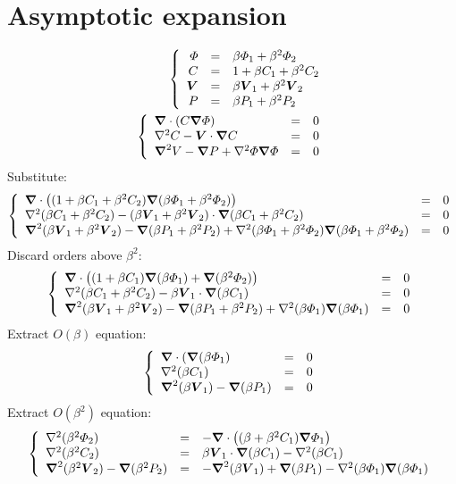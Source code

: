 \section{Asymptotic expansion}
\begin{eqnarray}
 \brc{rcl}{
  \varPhi &=& \beta\varPhi_1 + \beta^2\varPhi_2 \\
  C &=& 1 + \beta C_1 + \beta^2 C_2 \\
  \bV &=& \beta \bV_1 + \beta^2 \bV_2 \\
  P &=& \beta P_1 + \beta^2 P_2}
  \\
 \brc{lll}{
  \bnabla \cdot \brcs{C \bnabla \varPhi} &=& 0 \\
  \Laplacian C - \bV \cdot \bnabla C &=& 0 \\
  \bLaplacian V - \bnabla P + \Laplacian \varPhi \bnabla\varPhi &=& 0 }
\end{eqnarray}
Substitute:
\begin{eqnarray}
 \brc{lll}{
  \bnabla \cdot \brcs{(1 + \beta C_1 + \beta^2 C_2) \bnabla (\beta\varPhi_1 + \beta^2\varPhi_2)} &=& 0 \\
  \Laplacian (\beta C_1 + \beta^2 C_2) - (\beta \bV_1 + \beta^2 \bV_2) \cdot \bnabla (\beta C_1 + \beta^2 C_2) &=& 0 \\
  \bLaplacian (\beta \bV_1 + \beta^2 \bV_2) - \bnabla (\beta P_1 + \beta^2 P_2) + \Laplacian (\beta\varPhi_1 + \beta^2\varPhi_2) \bnabla(\beta\varPhi_1 + \beta^2\varPhi_2) &=& 0 }
\end{eqnarray}
Discard orders above $\beta^2$:
\begin{eqnarray}
 \brc{lll}{
  \bnabla \cdot \brcs{(1 + \beta C_1) \bnabla (\beta \varPhi_1) + \bnabla(\beta^2\varPhi_2)} &=& 0 \\
  \Laplacian (\beta C_1 + \beta^2 C_2) - \beta \bV_1 \cdot \bnabla (\beta C_1) &=& 0 \\
  \bLaplacian (\beta \bV_1 + \beta^2 \bV_2) - \bnabla (\beta P_1 + \beta^2 P_2) + \Laplacian (\beta\varPhi_1) \bnabla(\beta\varPhi_1) &=& 0 }
\end{eqnarray}
Extract $O(\beta)$ equation:
\begin{eqnarray}
 \brc{lll}{
  \bnabla \cdot \brcs{\bnabla (\beta\varPhi_1} &=& 0 \\
  \Laplacian (\beta C_1) &=& 0 \\
  \bLaplacian (\beta \bV_1) - \bnabla (\beta P_1) &=& 0 }
\end{eqnarray}
Extract $O(\beta^2)$ equation:
\begin{eqnarray}
 \brc{lll}{
  \Laplacian (\beta^2 \varPhi_2) &=& - \bnabla \cdot \brcs{(\beta + \beta^2 C_1) \bnabla \varPhi_1}
  \\
  \Laplacian (\beta^2 C_2) &=& \beta \bV_1 \cdot \bnabla (\beta C_1) -\Laplacian (\beta C_1)
  \\
  \bLaplacian (\beta^2 \bV_2) - \bnabla (\beta^2 P_2) &=& - \bLaplacian (\beta \bV_1) + \bnabla (\beta P_1) - \Laplacian (\beta\varPhi_1) \bnabla(\beta\varPhi_1)}
\end{eqnarray}
